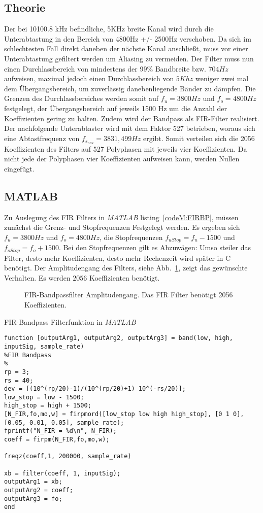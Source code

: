 \documentclass{article}
\begin{document}
\subsection{Theorie}
Der bei 10100.8 kHz befindliche, 5KHz breite Kanal wird durch die Unterabtastung in den Bereich von 4800Hz +/- 2500Hz verschoben. 
Da sich im schlechtesten Fall direkt daneben der nächste Kanal anschließt, muss vor einer Unterabtastung gefiltert werden um Aliasing zu vermeiden. 
Der Filter muss nun einen Durchlassbereich von mindestens der 99\% Bandbreite bzw. $704Hz$ aufweisen, maximal 
jedoch einen Durchlassbereich von $5Khz$ weniger zwei mal dem Übergangsbereich, um zuverlässig danebenliegende Bänder zu dämpfen. 
Die Grenzen des Durchlassbereiches werden somit auf $f_u = 3800Hz$ und $f_o = 4800Hz$ festgelegt, der Übergangsbereich auf jeweils 1500 Hz um die
Anzahl der Koeffizienten gering zu halten. Zudem wird der Bandpass als FIR-Filter realisiert. Der nachfolgende Unterabtaster 
wird mit dem Faktor 527 betrieben, woraus sich eine Abtastfrequenz von $f_{s_{neu}} = 3831,499Hz$ ergibt. Somit verteilen sich die 
2056 Koeffizienten des Filters auf 527 Polyphasen mit jeweils vier Koeffizienten. Da nicht jede der Polyphasen vier Koeffizienten aufweisen kann, 
werden Nullen eingefügt.

\subsection{MATLAB}
Zu Auslegung des FIR Filters in \textit{MATLAB} listing~\ref{codeM:FIRBP}, müssen zunächst die Grenz- und Stopfrequenzen Festgelegt werden.
Es ergeben sich $f_u = 3800Hz$ und $f_o = 4800Hz$, die Stopfrequenzen $f_{uStop} = f_u - 1500$ und $f_{oStop} = f_o + 1500$.
Bei den Stopfrequenzen gilt es Abzuwägen: Umso steiler das Filter, desto mehr Koeffizienten, desto mehr Rechenzeit wird später in C
benötigt. Der Amplitudengang des Filters, siehe Abb.~\ref{fig:fir_ampli}, zeigt das gewünschte Verhalten. Es werden $2056$ Koeffizienten benötigt.

\begin{figure}[!h]
    \label{fig:fir_ampli}
    \centering
    \def\svgscale{0.3}
    \def\svgwidth{\columnwidth}
    \caption{FIR-Bandpassfilter Amplitudengang. Das FIR Filter benötigt 2056 Koeffizienten.}
\end{figure}
\begin{listing}\label{codeM:FIRBP}
    \caption{FIR-Bandpass Filterfunktion in \textit{MATLAB}}
    \begin{verbatim}
function [outputArg1, outputArg2, outputArg3] = band(low, high, inputSig, sample_rate)
%FIR Bandpass
%
rp = 3; 
rs = 40;
dev = [(10^(rp/20)-1)/(10^(rp/20)+1) 10^(-rs/20)]; 
low_stop = low - 1500;
high_stop = high + 1500;
[N_FIR,fo,mo,w] = firpmord([low_stop low high high_stop], [0 1 0], [0.05, 0.01, 0.05], sample_rate);
fprintf("N_FIR = %d\n", N_FIR);
coeff = firpm(N_FIR,fo,mo,w);

freqz(coeff,1, 200000, sample_rate)

xb = filter(coeff, 1, inputSig);
outputArg1 = xb;
outputArg2 = coeff;
outputArg3 = fo;
end
    \end{verbatim}
\end{listing}
\end{document}
